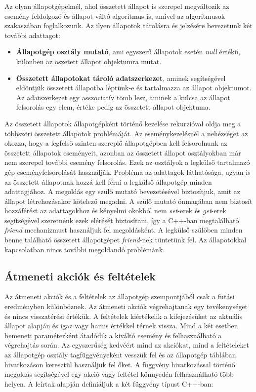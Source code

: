 \documentclass[a4paper,12pt]{report}
\begin{document}
Az olyan állapotgépeknél, ahol összetett állapot is szerepel megváltozik az esemény feldolgozó és állapot váltó algoritmus is, amivel az algoritmusok szakaszában foglalkozunk. Az ilyen állapotok tárolásra és jelzésére bevezetünk két további adattagot:
\begin{itemize}
\item {\bf Állapotgép osztály mutató}, ami egyszerű állapotok esetén {\it null} értékű, különben az öszetett állapot objektumra mutat.
\item {\bf Összetett állapotokat tároló adatszerkezet}, aminek segítségével eldöntjük összetett állapotba léptünk-e és tartalmazza az állapot objektumot. Az adatszerkezet egy asszociatív tömb lesz, aminek a kulcsa az állapot felsorolás egy elem, értéke pedig az összetett állapot objektuma.
\end{itemize}
Az összetett állapotok állapotgépként történő kezelése rekurzióval oldja meg a többszöri összetett állapotok problémáját. Az eseménykezelésnél a nehézséget az okozza, hogy a legfelső szinten szereplő állapotgépben kell felsorolnunk az összetett állapotok eseményeit, azonban az összetett állapot osztályokban már nem szerepel további esemény felsorolás. Ezek az osztályok a legkülső tartalmazó gép eseményfelsorolását használják. Probléma az adattagok láthatósága, ugyan is az összetett állapotnak hozzá kell férni a legkülső állapotgép minden adattagjához. A megoldás egy szülő mutató bevezetésével biztosítjuk, amit az állapot létrehozásakor kötelező megadni. A szülő mutató önmagában nem biztosít hozzáférést az adattagokhoz és kényelmi okokból nem {\it set}-erek és {\it get}-erek segítségével szeretnénk ezek elérését biztosítani, így a C++-ban megtalálható {\it friend} mechanizmust használjuk fel megoldásként. A legkülső szülőben minden benne található összetett állapotgépet {\it friend}-nek tüntetünk fel.
Az állapotokkal kapcsolatban nincs további megoldandó problémánk.

\subsection{Átmeneti akciók és feltételek}

Az átmeneti akciók és a feltételek az állapotgép szempontjából csak a futási eredményben különböznek.
Az átmeneti akciók végrehajtanak egy tevékenységet és nincs visszatérési értékük. A feltételek kiértékelik a kifejezésüket az aktuális állapot alapján és igaz vagy hamis értékkel térnek vissza. Mind a két esetben bemeneti paraméterként átadódik a kiváltó esemény és felhasználható a végrehajtás során. Az egyszerűség kedvéért mind az akciókat, mind a feltételeket az állapotgép osztály tagfüggvényeként vesszük fel és az állapotgép táblában hivatkozáson keresztül használjuk fel őket. A függvény hivatkozással történő megoldás segítségével egy akció vagy feltétel könnyedén felhasználható több helyen. A leírtak alapján definiáljuk a két függvény típust C++-ban:
\end{document}
